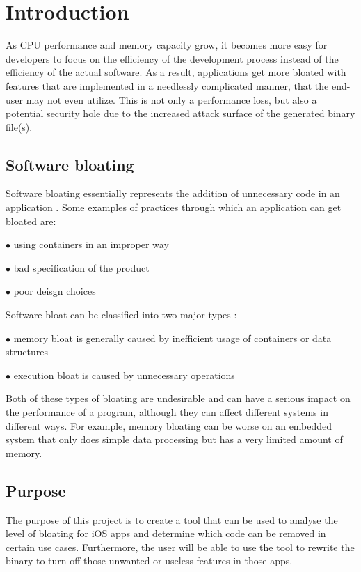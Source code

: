 \chapter{Introduction}

As CPU performance and memory capacity grow, it becomes more easy for developers
to focus on the efficiency of the development process instead of the efficiency of
the actual software. As a result, applications get more bloated with features that
are implemented in a needlessly complicated manner, that the end-user may not even utilize.
This is not only a performance loss, but also a potential security hole due to the
increased attack surface of the generated binary file(s).

\section{Software bloating}
Software bloating essentially represents the addition of unnecessary code in an application \cite{explor_bloat}.
Some examples of practices through which an application can get bloated are:
\begin{compactitem}
	\item[$\bullet$] using containers in an improper way
	\item[$\bullet$] bad specification of the product
	\item[$\bullet$] poor deisgn choices
\end{compactitem}
Software bloat can be classified into two major types \cite{bloating_article}:
\begin{compactitem}
	\item[$\bullet$] memory bloat is generally caused by inefficient usage of containers or data structures
	\item[$\bullet$] execution bloat is caused by unnecessary operations
\end{compactitem}
Both of these types of bloating are undesirable and can have a serious impact on the
performance of a program, although they can affect different systems in different ways.
For example, memory bloating can be worse on an embedded system that only does simple
data processing but has a very limited amount of memory.

\section{Purpose}
The purpose of this project is to create a tool that can be used to
analyse the level of bloating for iOS apps and determine which code can be removed in
certain use cases. Furthermore, the user will be able to use the tool to rewrite
the binary to turn off those unwanted or useless features in those apps.

